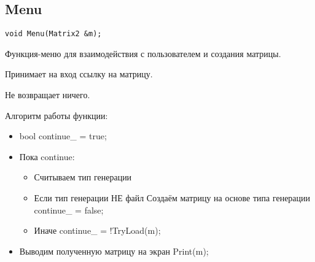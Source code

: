 \subsection*{Menu}

\begin{lstlisting}[label={lst:Menu}]
	void Menu(Matrix2 &m);
\end{lstlisting}

Функция-меню для взаимодействия с пользователем и создания матрицы.

Принимает на вход ссылку на матрицу.

Не возвращает ничего.

Алгоритм работы функции:

\begin{itemize}
	\item bool continue\_ = true;
	\item Пока continue:
	\begin{itemize}
		  \item Считываем тип генерации
		  \item Если тип генерации НЕ файл
		  \subitem Создаём матрицу на основе типа генерации
		  \subitem continue\_ = false;
		  \item Иначе
		  \subitem continue\_ = !TryLoad(m);
	\end{itemize}
	\item Выводим полученную матрицу на экран Print(m);
\end{itemize}